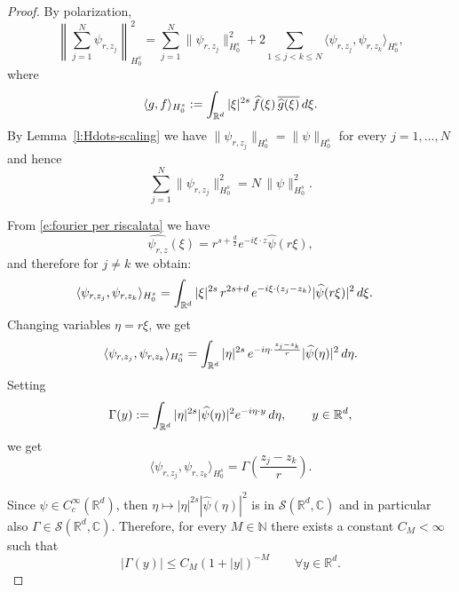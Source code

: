 \documentclass[10pt,a4paper]{amsart}
\newcommand{\N}{\mathbb{N}}
\newcommand{\R}{\mathbb{R}}
\newcommand{\dd}{\textup{d}}
\begin{document}
\begin{proof}
By polarization,
\begin{equation}\label{e:pitagora}
\left\|\sum_{j=1}^N \psi_{r,z_j}\right\|_{H_0^s}^2
=
\sum_{j=1}^N \|\psi_{r,z_j}\|_{H_0^s}^2
+
2\sum_{1\le j<k\le N}
\langle \psi_{r,z_j},\psi_{r,z_k}\rangle_{H_0^s},  \end{equation}
where
\begin{equation*}
\langle g,f\rangle_{H_0^s}
:=
\int_{\R^d} |\xi|^{2s}\,\widehat f(\xi)\,\overline{\widehat g(\xi)}\,\dd\xi.
\end{equation*}
By Lemma~\ref{l:Hdots-scaling} we have $\|\psi_{r,z_j}\|_{H_0^s}=\|\psi\|_{H_0^s}$  for every $j=1,\dots,N$ and hence
\begin{equation*}
    \sum_{j=1}^N \|\psi_{r,z_j}\|_{H_0^s}^2
=
N\,\|\psi\|_{H_0^s}^2.
\end{equation*}

From \eqref{e:fourier per riscalata} we have
\begin{equation*}
\widehat{\psi_{r,z}}(\xi)
=
r^{s+\frac d2} e^{-i\xi\cdot z}\widehat\psi(r\xi),    
\end{equation*}
and therefore for $j\neq k$ we obtain:
\begin{align*}
\langle \psi_{r,z_j},\psi_{r,z_k}\rangle_{H_0^s}
&=
\int_{\R^d}
|\xi|^{2s}\,
r^{2s+d}\,
e^{-i\xi\cdot(z_j-z_k)}
|\widehat\psi(r\xi)|^2\,\dd\xi.
\end{align*}
Changing variables $\eta=r\xi$, we get
\begin{equation*}
\langle \psi_{r,z_j},\psi_{r,z_k}\rangle_{H_0^s}
=
\int_{\R^d}
|\eta|^{2s}\,
e^{-i\eta\cdot \frac{z_j-z_k}{r}}
|\widehat\psi(\eta)|^2\,\dd\eta.    
\end{equation*}
Setting
\begin{equation}\label{eq:Gamma-def}
\Gamma(y)
:=
\int_{\R^d}
|\eta|^{2s}|\widehat\psi(\eta)|^2 e^{-i\eta\cdot y}\,\dd\eta,
\qquad y\in\R^d,
\end{equation}
we get
\begin{equation}\label{eq:cross-term-Gamma}
\langle \psi_{r,z_j},\psi_{r,z_k}\rangle_{H_0^s}
=
\Gamma \left(\frac{z_j-z_k}{r}\right).
\end{equation}

Since $\psi\in C_c^\infty(\R^d)$, then $\eta\mapsto |\eta|^{2s}|\widehat\psi(\eta)|^2$ is in $\mathcal{S}(\R^d,\mathbb{C})$ and in particular also $\Gamma \in \mathcal S(\R^d,\mathbb{C})$. Therefore, for every $M\in \N$ there exists a constant $C_M<\infty$ such that
\begin{equation}\label{eq:Gamma-decay}
|\Gamma(y)|\le C_M(1+|y|)^{-M}\qquad\forall y\in\R^d.
\end{equation}


\end{proof}
\end{document}
